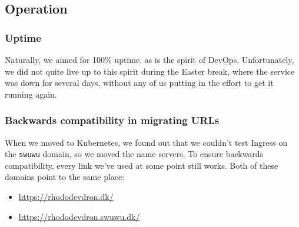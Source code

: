 \subsection{Operation}

\subsubsection{Uptime}

Naturally, we aimed for 100\% uptime, as is the spirit of DevOps. Unfortunately, we did not quite live up to this spirit during the Easter break, where the service was down for several days, without any of us putting in the effort to get it running again.


\subsubsection{Backwards compatibility in migrating URLs}

When we moved to Kubernetes, we found out that we couldn't test Ingress on the \texttt{swuwu} domain, so we moved the name servers. To ensure backwards compatibility, every link we've used at some point still works.
Both of these domains point to the same place:
\begin{itemize}
    \item \url{https://rhododevdron.dk/}
    \item \url{https://rhododevdron.swuwu.dk/}
\end{itemize}
